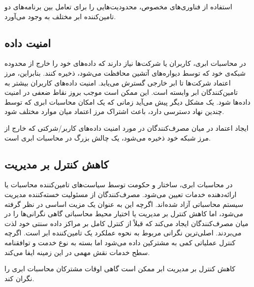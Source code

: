 \documentclass{book}
\begin{document}
    \begin{addinfo}
        
        استفاده از فناوری‌های مخصوص، محدودیت‌هایی را برای تعامل بین برنامه‌های دو تامین‌کننده ابر مختلف به وجود می‌آورد.

    \end{addinfo}

    \subsection{امنیت داده}

        در محاسبات ابری، کاربران یا شرکت‌ها نیاز دارند که داده‌های خود را خارج از محدوده شبکه‌ی خود که توسط دیواره‌های آتشین محافظت می‌شود، ذخیره کنند. بنابراین، مرز اعتماد شرکت‌ها تا ابر خارجی گسترش می‌یابد. امنیت داده‌های کاربران بیشتر به تامین‌کنندگان ابر وابسته است. این ممکن است موجب بروز نقاط ضعفی در امنیت داده‌ها شود. یک مشکل دیگر پیش می‌آید زمانی که یک امکان محاسبات ابری که توسط چندین نهاد دسترسی دارد، باعث اشتراک مرز اعتماد میان موارد مختلف شود.
    
    \begin{addinfo}

        ایجاد اعتماد در میان مصرف‌کنندگان در مورد امنیت داده‌های کاربر/شرکتی که خارج از مرز شبکه خود ذخیره می‌شود، یک چالش بزرگ در محاسبات ابری است.
        
    \end{addinfo}

    \subsection{کاهش کنترل بر مدیریت}

        در محاسبات ابری، ساختار و حکومت توسط سیاست‌های تامین‌کننده محاسبات یا ارائه‌دهنده خدمات تعیین می‌شود. مصرف‌کنندگان از مسئولیت خسته‌کننده مدیریت سیستم محاسباتی آزاد شده‌اند. اگرچه این به عنوان یک مزیت اساسی در نظر گرفته می‌شود، اما کاهش کنترل بر مدیریت یا اختیار محیط محاسباتی گاهی نگرانی‌ها را در میان مصرف‌کنندگان ایجاد می‌کند که قبلاً از کنترل کامل بر مراکز داده سنتی خود لذت می‌بردند. اصلی‌ترین نگرانی مربوط به نحوه عملکرد یک تامین‌کننده ابر است. اگرچه کنترل عملیاتی کمی به مشترکین داده می‌شود اما بسته به نوع خدمت و توافقنامه سطح خدمات نقش مهمی در این زمینه ایفا می‌کند.

    \begin{addinfo}
        
        کاهش کنترل بر مدیریت ابر ممکن است گاهی اوقات مشترکان محاسبات ابری را نگران کند.
        
    \end{addinfo}
\end{document}
